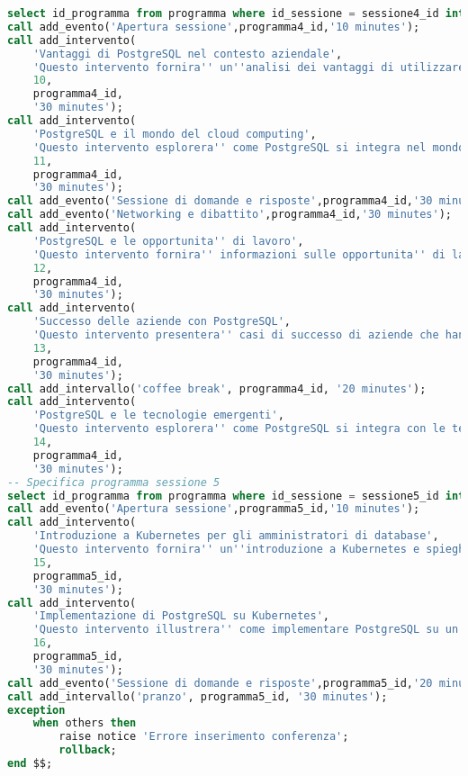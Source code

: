 \begin{lstlisting}[language=SQL, style=mystyle,caption={Conferenza PGConf NPL}]
select id_programma from programma where id_sessione = sessione4_id into programma4_id;
call add_evento('Apertura sessione',programma4_id,'10 minutes');
call add_intervento(
    'Vantaggi di PostgreSQL nel contesto aziendale',
    'Questo intervento fornira'' un''analisi dei vantaggi di utilizzare PostgreSQL nel contesto aziendale, compresa l''affidabilita'', le prestazioni e il supporto della comunita''.',
    10,
    programma4_id,
    '30 minutes');
call add_intervento(
    'PostgreSQL e il mondo del cloud computing',
    'Questo intervento esplorera'' come PostgreSQL si integra nel mondo del cloud computing e come le aziende possono trarre vantaggio dall''utilizzo di PostgreSQL come database cloud-native.',
    11,
    programma4_id,
    '30 minutes');
call add_evento('Sessione di domande e risposte',programma4_id,'30 minutes');
call add_evento('Networking e dibattito',programma4_id,'30 minutes');
call add_intervento(
    'PostgreSQL e le opportunita'' di lavoro',
    'Questo intervento fornira'' informazioni sulle opportunita'' di lavoro e carriera legate all''esperienza con PostgreSQL, inclusi i ruoli professionali, le competenze richieste e le tendenze del mercato.',
    12,
    programma4_id,
    '30 minutes');
call add_intervento(
    'Successo delle aziende con PostgreSQL',
    'Questo intervento presentera'' casi di successo di aziende che hanno adottato PostgreSQL come database principale e i benefici che hanno ottenuto.',
    13,
    programma4_id,
    '30 minutes');
call add_intervallo('coffee break', programma4_id, '20 minutes');
call add_intervento(
    'PostgreSQL e le tecnologie emergenti',
    'Questo intervento esplorera'' come PostgreSQL si integra con le tecnologie emergenti, come l''intelligenza artificiale, l''Internet of Things (IoT) e l''analisi dei big data.',
    14,
    programma4_id,
    '30 minutes');
-- Specifica programma sessione 5
select id_programma from programma where id_sessione = sessione5_id into programma5_id;
call add_evento('Apertura sessione',programma5_id,'10 minutes');
call add_intervento(
    'Introduzione a Kubernetes per gli amministratori di database',
    'Questo intervento fornira'' un''introduzione a Kubernetes e spieghera'' come gli amministratori di database possono utilizzare questa piattaforma per orchestrare e gestire il deployment di istanze di PostgreSQL.',
    15,
    programma5_id,
    '30 minutes');
call add_intervento(
    'Implementazione di PostgreSQL su Kubernetes',
    'Questo intervento illustrera'' come implementare PostgreSQL su un cluster Kubernetes, fornendo linee guida e best practice per il deployment, la scalabilita'' e la gestione delle istanze di PostgreSQL.',
    16,
    programma5_id,
    '30 minutes');
call add_evento('Sessione di domande e risposte',programma5_id,'20 minutes');
call add_intervallo('pranzo', programma5_id, '30 minutes');
exception
    when others then
        raise notice 'Errore inserimento conferenza';
        rollback;
end $$;
\end{lstlisting}
